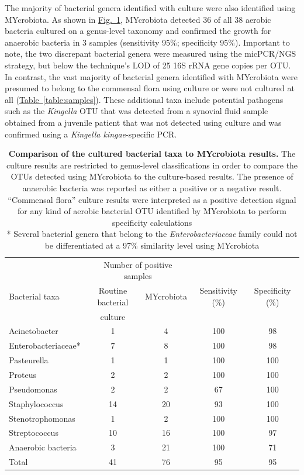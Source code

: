 The majority of bacterial genera identified with culture were also identified using MYcrobiota. As shown in \hyperref[table:comparison]{Fig.~\ref{table:comparison}}, MYcrobiota detected 36 of all 38 aerobic bacteria cultured on a genus-level taxonomy and confirmed the growth for anaerobic bacteria in 3 samples (sensitivity 95\%; specificity 95\%). Important to note, the two discrepant bacterial genera were measured using the micPCR/NGS strategy, but below the technique’s LOD of 25 16S rRNA gene copies per OTU\@. In contrast, the vast majority of bacterial genera identified with MYcrobiota were presumed to belong to the commensal flora using culture or were not cultured at all (\hyperref[table:samples]{Table~\ref{table:samples}}). These additional taxa include potential pathogens such as the \textit{Kingella} OTU that was detected from a synovial fluid sample obtained from a juvenile patient that was not detected using culture and was confirmed using a \textit{Kingella kingae}-specific PCR.

\begin{table}
\begin{tabular}{lcccc}
               & \multicolumn{2}{c}{Number of positive samples} &                  &                  \\
Bacterial taxa & Routine bacterial  & MYcrobiota                 & Sensitivity (\%) & Specificity (\%) \\
               & culture            &                            &                  &                  \\ \hline
Acinetobacter       & 1  & 4  & 100 & 98 \\
Enterobacteriaceae* & 7  & 8  & 100 & 98 \\
Pasteurella         & 1  & 1  & 100 & 100 \\
Proteus             & 2  & 2  & 100 & 100 \\
Pseudomonas         & 2  & 2  & 67  & 100 \\
Staphylococcus      & 14 & 20 & 93  & 100 \\
Stenotrophomonas    & 1  & 2  & 100 & 100 \\
Streptococcus       & 10 & 16 & 100 & 97  \\
Anaerobic bacteria  & 3  & 21 & 100 & 71  \\ \hline
Total               & 41 & 76 & 95  & 95
\end{tabular}
\caption{\textbf{Comparison of the cultured bacterial taxa to MYcrobiota results.} The culture results are restricted to genus-level classifications in order to compare the OTUs detected using MYcrobiota to the culture-based results. The presence of anaerobic bacteria was reported as either a positive or a negative result. “Commensal flora” culture results were interpreted as a positive detection signal for any kind of aerobic bacterial OTU identified by MYcrobiota to perform specificity calculations \\ * Several bacterial genera that belong to the \textit{Enterobacteriaceae} family could not be differentiated at a 97\% similarity level using MYcrobiota}
\label{table:comparison}
\end{table}

